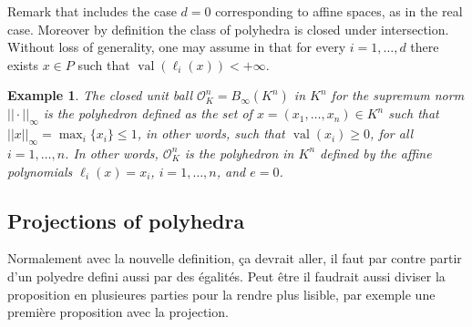 \documentclass[a4paper,12pt]{article}
\newtheorem{example}{Example}
\newcommand{\aff}[1]{{\text{aff}(#1)}} %
\newcommand{\relint}[1]{{\text{relint}(#1)}} %
\newcommand{\simone}[1]{{\color{blue} #1}} %
\DeclareMathOperator{\val}{val}
\newcommand{\OK}{\mathcal{O}_K}
\begin{document}
Remark that  includes the case $d=0$ corresponding to affine spaces, as in the real case.
Moreover by definition the class of polyhedra is closed under intersection. Without loss of generality, one may
assume in  that for every $i=1,\ldots,d$ there exists $x \in P$ such that
$\val(\ell_i(x))<+\infty$.

\begin{example}
  The \emph{closed unit ball} $\OK^n=B_\infty(K^n)$ in $K^n$ for the supremum norm $||\cdot||_{\infty}$ is the
  polyhedron defined as the set of $x=(x_1,\ldots,x_n) \in K^n$ such that $||x||_{\infty} =
  \max_i\{x_i\} \leq 1$, in other words, such that $\val(x_i) \geq 0$, for all $i=1, \ldots, n$.
  In other words, $\OK^n$ is the polyhedron in $K^n$ defined by the affine polynomials
  $\ell_i(x)=x_i$, $i=1,\ldots, n$, and $e=0$. %
\end{example}


\subsection{Projections of polyhedra}

{\color{blue} Normalement avec la nouvelle definition, ça devrait aller, il faut par contre
  partir d'un polyedre defini aussi par des égalités. Peut être il faudrait aussi
  diviser la proposition en plusieures parties pour la rendre plus lisible, par exemple une
  première proposition avec la projection.}
\end{document}
